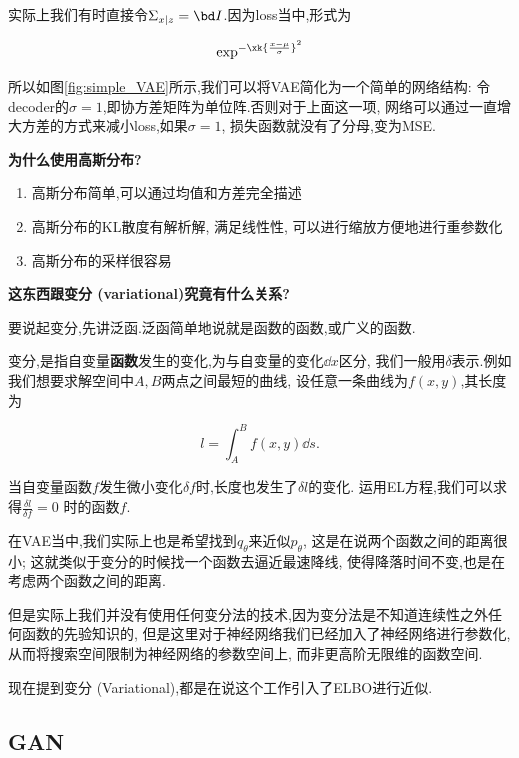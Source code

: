	实际上我们有时直接令$\Sigma_{x \mid z} = \bd I$.因为loss当中,形式为

	\begin{equation}
		\exp^{-\xk{\frac{x - \mu}{\sigma}}^2}
	\end{equation}

	所以如图\ref{fig:simple_VAE}所示,我们可以将VAE简化为一个简单的网络结构:
	令decoder的$\sigma = 1$,即协方差矩阵为单位阵.否则对于上面这一项,
	网络可以通过一直增大方差的方式来减小loss,如果$\sigma = 1$,
	损失函数就没有了分母,变为MSE.

	\textbf{为什么使用高斯分布?}
	
	\begin{enumerate}
		\item 高斯分布简单,可以通过均值和方差完全描述
		\item 高斯分布的KL散度有解析解, 满足线性性, 可以进行缩放方便地进行重参数化
		\item 高斯分布的采样很容易
	\end{enumerate}
	
	\textbf{这东西跟变分 (variational)究竟有什么关系?}
	
	要说起变分,先讲泛函.泛函简单地说就是函数的函数,或广义的函数.

	变分,是指自变量\textbf{函数}发生的变化,为与自变量的变化$\dd x$区分,
	我们一般用$\delta$表示.例如我们想要求解空间中$A, B$两点之间最短的曲线,
	设任意一条曲线为$f(x, y)$,其长度为

	\begin{equation}
		l = \int_{A}^{B} f(x,  y) \dd s.
	\end{equation}

	当自变量函数$f$发生微小变化$\delta f$时,长度也发生了$\delta l$的变化.
	运用EL方程,我们可以求得$\frac{\delta l}{\delta f} = 0$
	时的函数$f$.
	
	在VAE当中,我们实际上也是希望找到$q_\theta$来近似$p_{\theta}$,
	这是在说两个函数之间的距离很小;
	这就类似于变分的时候找一个函数去逼近最速降线,
	使得降落时间不变,也是在考虑两个函数之间的距离.

	但是实际上我们并没有使用任何变分法的技术,因为变分法是不知道连续性之外任何函数的先验知识的,
	但是这里对于神经网络我们已经加入了神经网络进行参数化,从而将搜索空间限制为神经网络的参数空间上,
	而非更高阶无限维的函数空间.

	现在提到变分 (Variational),都是在说这个工作引入了ELBO进行近似.

	\subsection{GAN}

